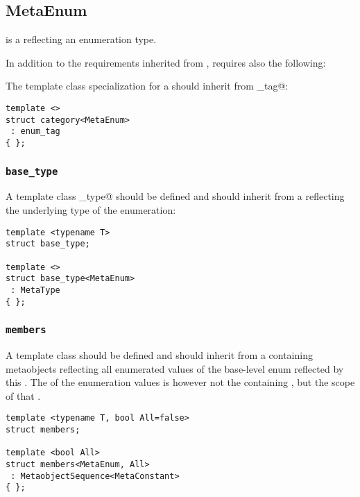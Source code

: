 \subsection{MetaEnum}
\label{concept-MetaEnum}

 is a  reflecting an enumeration type.

In addition to the requirements inherited from ,  requires
also the following:

The \verb@category@ template class specialization for a  should
inherit from \verb@enum_tag@:

\begin{verbatim}
template <>
struct category<MetaEnum>
 : enum_tag
{ };
\end{verbatim}

\subsubsection{\texttt{base\_type}}

A template class \verb@base_type@ should be defined and should inherit from
a  reflecting the underlying type of the enumeration:

\begin{verbatim}
template <typename T>
struct base_type;

template <>
struct base_type<MetaEnum>
 : MetaType
{ };
\end{verbatim}

\subsubsection{\texttt{members}}

A template class \verb@members@ should be defined and should inherit from a
 containing   metaobjects
reflecting all enumerated values of the base-level enum reflected by
this . The \verb@scope@ of the enumeration values is however not the
containing \verb@enum@, but the scope of that \verb@enum@.

\begin{verbatim}
template <typename T, bool All=false>
struct members;

template <bool All>
struct members<MetaEnum, All>
 : MetaobjectSequence<MetaConstant>
{ };
\end{verbatim}

